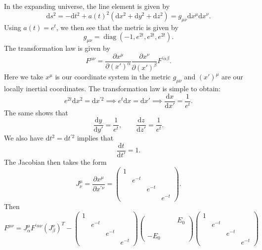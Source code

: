 \documentclass[11pt, letterpaper]{article}
\theoremstyle{plain}
\begin{document}
In the expanding universe, the line element is given by
\[
	\mathrm{d} s^2=-\mathrm{d} t^2+a(t)^2\left( \mathrm{d} x^2+\mathrm{d} y^2+\mathrm{d} z^2 \right) = g_{\mu \nu } \mathrm{d} x^\mu \mathrm{d} x^\nu 
.\]
Using $a(t)=e^t$, we then see that the metric is given by
\[
	g_{\mu \nu } =\operatorname{diag} (-1,e^{2t} ,e^{2t} ,e^{2t})
.\]
The transformation law is given by
\[
	F^{\mu \nu } =\frac{\partial x^\mu }{\partial (x')^\alpha } \frac{\partial x^\nu }{\partial (x')^\beta } F^{\prime \alpha \beta } 
.\]
Here we take $x^\mu $ is our coordinate system in the metric $g_{\mu \nu } $ and $(x')^\mu $ are our locally inertial coordinates. The transformation law is simple to obtain:
\[
	e^{2t}\mathrm{d} x^2=\mathrm{d} x^{\prime 2} \implies e^t \mathrm{d} x=\mathrm{d} x'\implies \frac{\mathrm{d}x}{\mathrm{d}x'} =\frac{1}{e^t} 
.\]
The same shows that
\[
	\frac{\mathrm{d}y}{\mathrm{d}y'} =\frac{1}{e^t},\qquad \frac{\mathrm{d}z}{\mathrm{d}z'} =\frac{1}{e^t} 
.\]
We also have $\mathrm{d} t^2=\mathrm{d} t^{\prime 2} $ implies that
\[
	\frac{\mathrm{d}t}{\mathrm{d}t'} =1
.\]
The Jacobian then takes the form
\[
	J^{\mu }_\nu =\frac{\partial x^\mu }{\partial x^{\prime \nu } } =\begin{pmatrix}
	1 &  &  &  \\
	 & e^{-t}  &  &  \\
	 &  & e^{-t}  &  \\
	 &  &  & e^{-t} 
	\end{pmatrix}
.\]
Then
\[
	F^{\mu \nu } =J^\mu_\alpha F^{\prime \alpha \nu } \left(J^{\nu }_\beta \right)^T-\begin{pmatrix}
	1 &  &  &  \\
	 & e^{-t}  &  &  \\
	 &  & e^{-t}  &  \\
	 &  &  & e^{-t} 
	\end{pmatrix}\begin{pmatrix}
	 &  &  & E_0 \\
	 &  &  &  \\
	 &  &  &  \\
	-E_0 &  &  & 
	\end{pmatrix}\begin{pmatrix}
	1 &  &  &  \\
	 & e^{-t}  &  &  \\
	 & & e^{-t}  &  \\
	 &  &  & e^{-t} 
	\end{pmatrix}
\]
\end{document}
